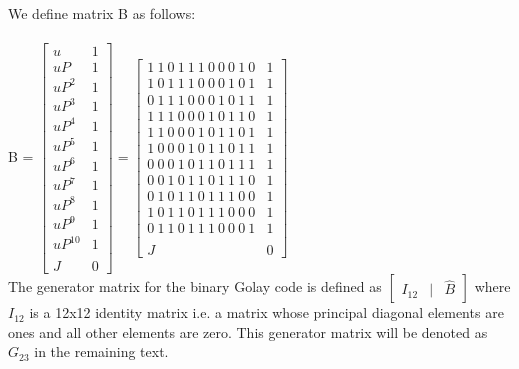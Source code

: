 We define matrix B as follows:\\\\
\tab \tab \tab B = $ \begin{bmatrix}u & 1 \\u P & 1 \\u P^2 & 1\\u P^3 & 1\\u P^4 & 1\\u P^5 & 1\\u P^6 & 1\\u P^7 & 1\\u P^8 & 1\\u P^9 & 1\\u P^{10} & 1\\ & \\J & 0\end{bmatrix} = \begin{bmatrix}1\:1\:0\:1\:1\:1\:0\:0\:0\:1\:0 & 1 \\ 1\:0\:1\:1\:1\:0\:0\:0\:1\:0\:1 & 1 \\ 0\:1\:1\:1\:0\:0\:0\:1\:0\:1\:1 & 1 \\ 1\:1\:1\:0\:0\:0\:1\:0\:1\:1\:0 & 1 \\ 1\:1\:0\:0\:0\:1\:0\:1\:1\:0\:1 & 1 \\ 1\:0\:0\:0\:1\:0\:1\:1\:0\:1\:1 & 1 \\ 0\:0\:0\:1\:0\:1\:1\:0\:1\:1\:1 & 1 \\ 0\:0\:1\:0\:1\:1\:0\:1\:1\:1\:0 & 1 \\
0\:1\:0\:1\:1\:0\:1\:1\:1\:0\:0 & 1 \\ 1\:0\:1\:1\:0\:1\:1\:1\:0\:0\:0 & 1 \\ 0\:1\:1\:0\:1\:1\:1\:0\:0\:0\:1 & 1\\ & \\J & 0\end{bmatrix} $\\

The generator matrix for the binary Golay code is defined as $ \begin{bmatrix} I_{12} & | & \hat{B}\end{bmatrix} $ where $I_{12}$ is a 12x12 identity matrix i.e. a matrix whose principal diagonal elements are ones and all other elements are zero. This generator matrix will be denoted as $G_{23}$ in the remaining text.\\

